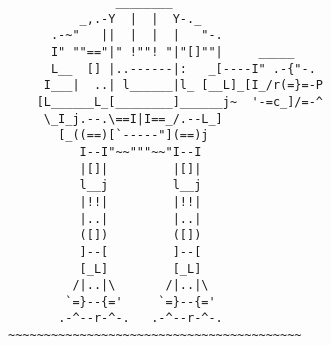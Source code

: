 \documentclass[12pt]{article}
\begin{document}
\vfill
\centering
\tiny %
\begin{BVerbatim}
               ________
          _,.-Y  |  |  Y-._
      .-~"   ||  |  |  |   "-.
      I" ""=="|" !""! "|"[]""|     _____
      L__  [] |..------|:   _[----I" .-{"-.
     I___|  ..| l______|l_ [__L]_[I_/r(=}=-P
    [L______L_[________]______j~  '-=c_]/=-^
     \_I_j.--.\==I|I==_/.--L_]
       [_((==)[`-----"](==)j
          I--I"~~"""~~"I--I
          |[]|         |[]|
          l__j         l__j
          |!!|         |!!|
          |..|         |..|
          ([])         ([])
          ]--[         ]--[
          [_L]         [_L]
         /|..|\       /|..|\
        `=}--{='     `=}--{='
       .-^--r-^-.   .-^--r-^-.
~~~~~~~~~~~~~~~~~~~~~~~~~~~~~~~~~~~~~~~~~
\end{BVerbatim}
\end{document}
